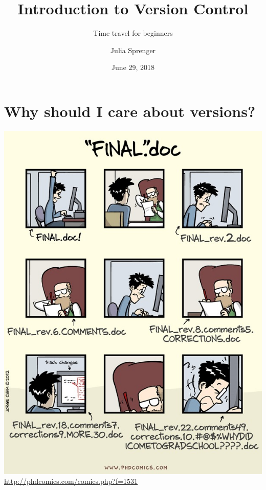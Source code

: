 \documentclass[
t, %
10pt, %
aspectratio=1610, %
ngerman,
english,
]{beamer}
\title{Introduction to Version Control}
\subtitle{Time travel for beginners}
\author{Julia Sprenger}
\institute[My Institute]{INM-6/10}
\date{June 29, 2018}
\begin{document}
\maketitle


\part{Why should I care about versions?}
\makepart

\begin{frame}[label=introduction]
    \centering
    \includegraphics[height=\textheight]{graphics/phd101212s.jpg}\\
    \url{http://phdcomics.com/comics.php?f=1531}
\end{frame}
\end{document}
